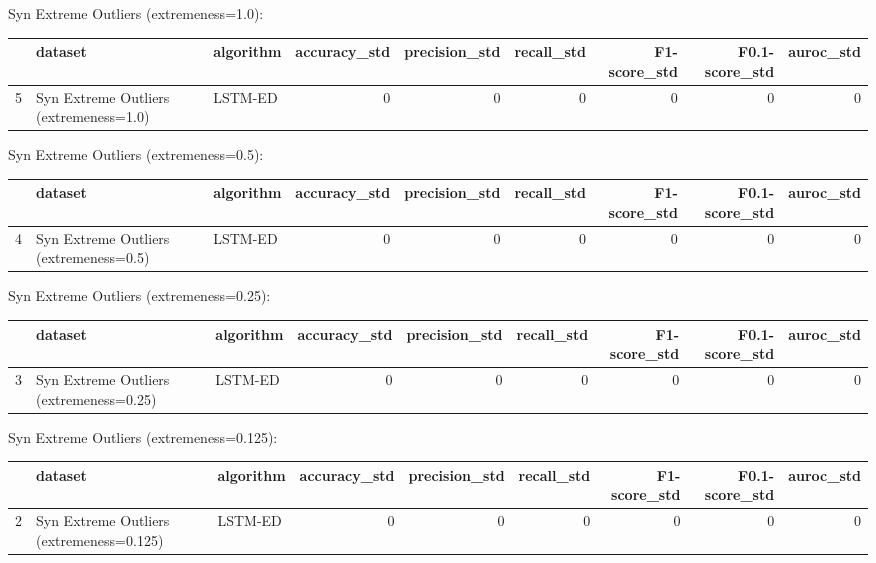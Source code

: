 Syn Extreme Outliers (extremeness=1.0):

\begin{tabular}{rllrrrrrr}
\hline
    & dataset                                & algorithm   &   accuracy\_std &   precision\_std &   recall\_std &   F1-score\_std &   F0.1-score\_std &   auroc\_std \\
\hline
  5 & Syn Extreme Outliers (extremeness=1.0) & LSTM-ED     &              0 &               0 &            0 &              0 &                0 &           0 \\
\hline
\end{tabular}

Syn Extreme Outliers (extremeness=0.5):

\begin{tabular}{rllrrrrrr}
\hline
    & dataset                                & algorithm   &   accuracy\_std &   precision\_std &   recall\_std &   F1-score\_std &   F0.1-score\_std &   auroc\_std \\
\hline
  4 & Syn Extreme Outliers (extremeness=0.5) & LSTM-ED     &              0 &               0 &            0 &              0 &                0 &           0 \\
\hline
\end{tabular}

Syn Extreme Outliers (extremeness=0.25):

\begin{tabular}{rllrrrrrr}
\hline
    & dataset                                 & algorithm   &   accuracy\_std &   precision\_std &   recall\_std &   F1-score\_std &   F0.1-score\_std &   auroc\_std \\
\hline
  3 & Syn Extreme Outliers (extremeness=0.25) & LSTM-ED     &              0 &               0 &            0 &              0 &                0 &           0 \\
\hline
\end{tabular}

Syn Extreme Outliers (extremeness=0.125):

\begin{tabular}{rllrrrrrr}
\hline
    & dataset                                  & algorithm   &   accuracy\_std &   precision\_std &   recall\_std &   F1-score\_std &   F0.1-score\_std &   auroc\_std \\
\hline
  2 & Syn Extreme Outliers (extremeness=0.125) & LSTM-ED     &              0 &               0 &            0 &              0 &                0 &           0 \\
\hline
\end{tabular}


